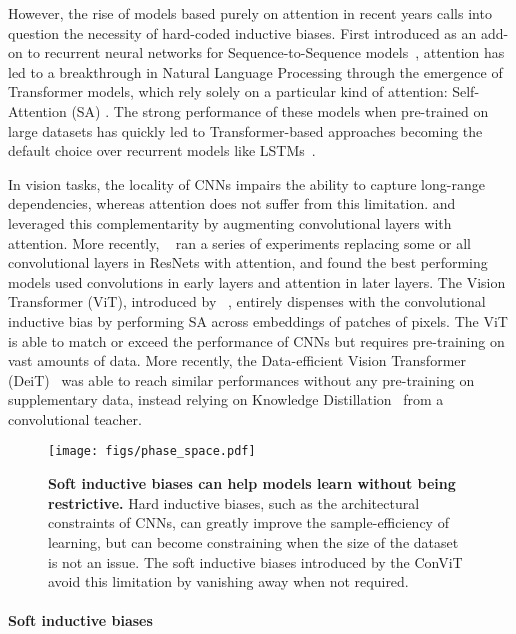 \documentclass[a4paper,11pt,twocolumn]{article}
\newcommand{\citet}[1]{\textcite{#1}}
\begin{document}
However, the rise of models based purely on attention in recent years calls into question the necessity of hard-coded inductive biases. First introduced as an add-on to recurrent neural networks for Sequence-to-Sequence models~\cite{bahdanau2014neural}, attention has led to a breakthrough in Natural Language Processing through the emergence of Transformer models, which rely solely on a particular kind of attention: Self-Attention (SA) \cite{vaswani2017attention}. The strong performance of these models when pre-trained on large datasets has quickly led to Transformer-based approaches becoming the default choice over recurrent models like LSTMs~\cite{devlin2018bert}.

In vision tasks, the locality of CNNs impairs the ability to capture long-range dependencies, whereas attention does not suffer from this limitation. \citet{chen20182} and ~\citet{bello2019attention} leveraged this complementarity by augmenting convolutional layers with attention. More recently, ~\citet{ramachandran2019stand} ran a series of experiments replacing some or all convolutional layers in ResNets with attention, and found the best performing models used convolutions in early layers and attention in later layers. The Vision Transformer (ViT), introduced by ~\citet{dosovitskiy2020image}, entirely dispenses with the convolutional inductive bias by performing SA across embeddings of patches of pixels. The ViT is able to match or exceed the performance of CNNs but requires pre-training on vast amounts of data. More recently, the Data-efficient Vision Transformer (DeiT)~\cite{touvron2020training} was able to reach similar performances without any pre-training on supplementary data, instead relying on Knowledge Distillation~\cite{hinton2015distilling} from a convolutional teacher.

\begin{figure}[t]
    \centering
    \texttt{[image: figs/phase\_space.pdf]}
    \caption{\textbf{Soft inductive biases can help models learn without being restrictive.} Hard inductive biases, such as the architectural constraints of CNNs, can greatly improve the sample-efficiency of learning, but can become constraining when the size of the dataset is not an issue. The soft inductive biases introduced by the ConViT avoid this limitation by vanishing away when not required. 
    }
    \label{fig:phase_space}
\end{figure}


\paragraph{Soft inductive biases}
\end{document}

